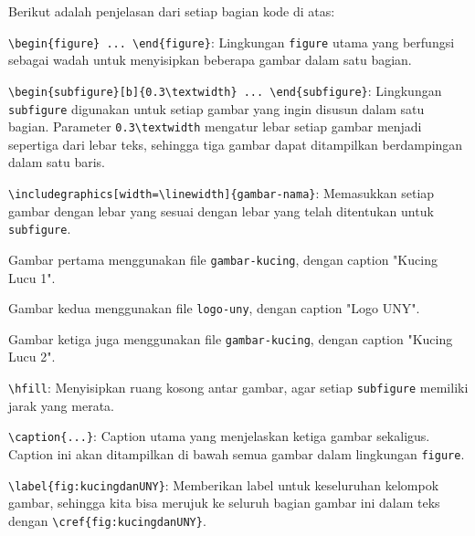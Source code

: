 \noindent Berikut adalah penjelasan dari setiap bagian kode di atas:

\begin{packed_enum}
    \item \texttt{\textbackslash begin\{figure\} ... \textbackslash end\{figure\}}: Lingkungan \texttt{figure} utama yang berfungsi sebagai wadah untuk menyisipkan beberapa gambar dalam satu bagian.
    
    \item \texttt{\textbackslash begin\{subfigure\}[b]\{0.3\textbackslash textwidth\} ... \textbackslash end\{subfigure\}}: Lingkungan \texttt{subfigure} digunakan untuk setiap gambar yang ingin disusun dalam satu bagian. Parameter \texttt{0.3\textbackslash textwidth} mengatur lebar setiap gambar menjadi sepertiga dari lebar teks, sehingga tiga gambar dapat ditampilkan berdampingan dalam satu baris.
    
    \item \texttt{\textbackslash includegraphics[width=\textbackslash linewidth]\{gambar-nama\}}: Memasukkan setiap gambar dengan lebar yang sesuai dengan lebar yang telah ditentukan untuk \texttt{subfigure}. 
        \begin{packed_enum}
            \item Gambar pertama menggunakan file \texttt{gambar-kucing}, dengan caption "Kucing Lucu 1".
            \item Gambar kedua menggunakan file \texttt{logo-uny}, dengan caption "Logo UNY".
            \item Gambar ketiga juga menggunakan file \texttt{gambar-kucing}, dengan caption "Kucing Lucu 2".
        \end{packed_enum}
    
    \item \texttt{\textbackslash hfill}: Menyisipkan ruang kosong antar gambar, agar setiap \texttt{subfigure} memiliki jarak yang merata.
    
    \item \texttt{\textbackslash caption\{...\}}: Caption utama yang menjelaskan ketiga gambar sekaligus. Caption ini akan ditampilkan di bawah semua gambar dalam lingkungan \texttt{figure}.

    \item \texttt{\textbackslash label\{fig:kucingdanUNY\}}: Memberikan label untuk keseluruhan kelompok gambar, sehingga kita bisa merujuk ke seluruh bagian gambar ini dalam teks dengan \texttt{\textbackslash cref\{fig:kucingdanUNY\}}.
\end{packed_enum}

